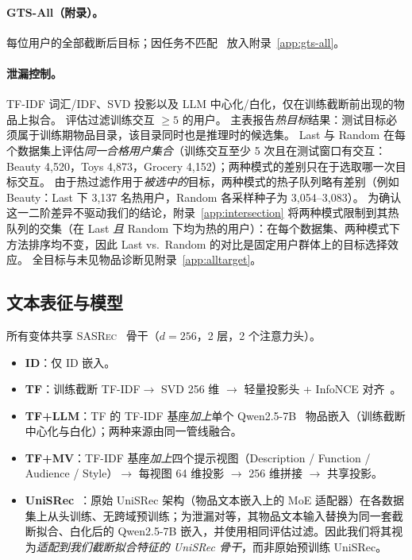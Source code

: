 \documentclass[sigconf,natbib=true,anonymous]{acmart}
\newcommand{\tfidf}{\textsc{TF-IDF}\xspace}
\newcommand{\tfllm}{\textsc{TF+LLM}\xspace}
\newcommand{\tfmv}{\textsc{TF+MV}\xspace}
\newcommand{\base}{\textsc{SASRec}\xspace}
\begin{document}
\paragraph{GTS-All（附录）。}
每位用户的全部截断后目标；因任务不匹配~\cite{gusak2025time} 放入附录~\ref{app:gts-all}。

\paragraph{泄漏控制。}
\tfidf 词汇/IDF、SVD 投影以及 LLM 中心化/白化，仅在训练截断前出现的物品上拟合。
评估过滤训练交互 $\ge 5$ 的用户。
主表报告\emph{热目标}结果：测试目标必须属于训练期物品目录，该目录同时也是推理时的候选集。
Last 与 Random 在每个数据集上评估\emph{同一合格用户集合}（训练交互至少 5 次且在测试窗口有交互：Beauty 4{,}520，Toys 4{,}873，Grocery 4{,}152）；两种模式的差别只在于选取哪一次目标交互。
由于热过滤作用于\emph{被选中的}目标，两种模式的热子队列略有差别（例如 Beauty：Last 下 3{,}137 名热用户，Random 各采样种子为 3{,}054--3{,}083）。
为确认这一二阶差异不驱动我们的结论，附录~\ref{app:intersection} 将两种模式限制到其热队列的交集（在 Last \emph{且} Random 下均为热的用户）：在每个数据集、两种模式下方法排序均不变，因此 Last vs.\ Random 的对比是固定用户群体上的目标选择效应。
全目标与未见物品诊断见附录~\ref{app:alltarget}。

\subsection{文本表征与模型}
\label{sec:models}

所有变体共享 \base~\cite{kang2018sasrec} 骨干（$d{=}256$，2 层，2 个注意力头）。

\begin{itemize}[leftmargin=*,itemsep=1pt]
\item \textbf{ID}：仅 ID 嵌入。
\item \textbf{TF}：训练截断 \tfidf $\to$ SVD 256 维 $\to$ 轻量投影头 + InfoNCE 对齐~\cite{oord2018cpc}。
\item \textbf{\tfllm}：TF 的 \tfidf 基座\emph{加上}单个 Qwen2.5-7B~\cite{qwen2024qwen25} 物品嵌入（训练截断中心化与白化）；两种来源由同一管线融合。
\item \textbf{\tfmv}：\tfidf 基座\emph{加上}四个提示视图（Description / Function / Audience / Style）$\to$ 每视图 64 维投影 $\to$ 256 维拼接 $\to$ 共享投影。
\item \textbf{UniSRec}~\cite{hou2022unisrec}：原始 UniSRec 架构（物品文本嵌入上的 MoE 适配器）在各数据集上从头训练、无跨域预训练；为泄漏对等，其物品文本输入替换为同一套截断拟合、白化后的 Qwen2.5-7B 嵌入，并使用相同评估过滤。因此我们将其视为\emph{适配到我们截断拟合特征的 UniSRec 骨干}，而非原始预训练 UniSRec。
\end{itemize}
\end{document}
